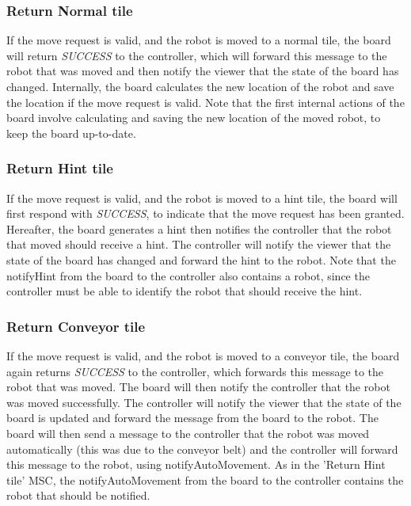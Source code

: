 	\subsubsection{Return Normal tile}
	\begin{minipage}{\linewidth}
		If the move request is valid, and the robot is moved to a normal tile, the board will return \emph{SUCCESS} to the controller, which will forward this message to the robot that was moved and then notify the viewer that the state of the board has changed. Internally, the board calculates the new location of the robot and save the location if the move request is valid. Note that the first internal actions of the board involve calculating and saving the new location of the moved robot, to keep the board up-to-date.

		
	\end{minipage}

	\subsubsection{Return Hint tile}
	\begin{minipage}{\linewidth}
		If the move request is valid, and the robot is moved to a hint tile, the board will first respond with \emph{SUCCESS}, to indicate that the move request has been granted. Hereafter, the board generates a hint then notifies the controller that the robot that moved should receive a hint. The controller will notify the viewer that the state of the board has changed and forward the hint to the robot. Note that the notifyHint from the board to the controller also contains a robot, since the controller must be able to identify the robot that should receive the hint.

		
	\end{minipage}

	\subsubsection{Return Conveyor tile}
	\begin{minipage}{\linewidth}
		If the move request is valid, and the robot is moved to a conveyor tile, the board again returns \emph{SUCCESS} to the controller, which forwards this message to the robot that was moved. The board will then notify the controller that the robot was moved successfully. The controller will notify the viewer that the state of the board is updated and forward the message from the board to the robot. The board will then send a message to the controller that the robot was moved automatically (this was due to the conveyor belt) and the controller will forward this message to the robot, using notifyAutoMovement. As in the 'Return Hint tile' MSC, the notifyAutoMovement from the board to the controller contains the robot that should be notified.

		
	\end{minipage}

